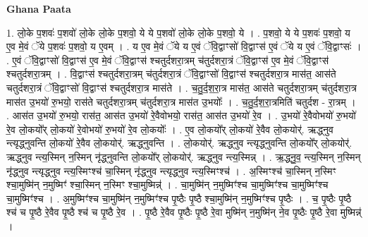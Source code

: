 \documentclass[17pt]{extarticle}
\begin{document}
\textbf{Ghana Paata } \newline

1. लो॒के प॒शवः॑ प॒शवो॑ लो॒के लो॒के प॒शवो॒ ये ये प॒शवो॑ लो॒के लो॒के प॒शवो॒ ये । . प॒शवो॒ ये ये प॒शवः॑ प॒शवो॒ य ए॒व मे॒वं ॅये प॒शवः॑ प॒शवो॒ य ए॒वम् । . य ए॒व मे॒वं ॅये य ए॒वं ॅवि॒द्वाꣳसो॑ वि॒द्वाꣳस॑ ए॒वं ॅये य ए॒वं ॅवि॒द्वाꣳसः॑ । . ए॒वं ॅवि॒द्वाꣳसो॑ वि॒द्वाꣳस॑ ए॒व मे॒वं ॅवि॒द्वाꣳस॑ श्चतुर्दशरा॒त्रम् च॑तुर्दशरा॒त्रं ॅवि॒द्वाꣳस॑ ए॒व मे॒वं ॅवि॒द्वाꣳस॑ श्चतुर्दशरा॒त्रम् । . वि॒द्वाꣳस॑ श्चतुर्दशरा॒त्रम् च॑तुर्दशरा॒त्रं ॅवि॒द्वाꣳसो॑ वि॒द्वाꣳस॑ श्चतुर्दशरा॒त्र मास॑त॒ आस॑ते चतुर्दशरा॒त्रं ॅवि॒द्वाꣳसो॑ वि॒द्वाꣳस॑ श्चतुर्दशरा॒त्र मास॑ते । . च॒तु॒र्द॒श॒रा॒त्र मास॑त॒ आस॑ते चतुर्दशरा॒त्रम् च॑तुर्दशरा॒त्र मास॑त उ॒भयो॑ रु॒भयो॒ रास॑ते चतुर्दशरा॒त्रम् च॑तुर्दशरा॒त्र मास॑त उ॒भयोः᳚ । . च॒तु॒र्द॒श॒रा॒त्रमिति॑ चतुर्दश - रा॒त्रम् । . आस॑त उ॒भयो॑ रु॒भयो॒ रास॑त॒ आस॑त उ॒भयो॑ रे॒वैवोभयो॒ रास॑त॒ आस॑त उ॒भयो॑ रे॒व । . उ॒भयो॑ रे॒वैवोभयो॑ रु॒भयो॑ रे॒व लो॒कयो᳚र् लो॒कयो॑ रे॒वोभयो॑ रु॒भयो॑ रे॒व लो॒कयोः᳚ । . ए॒व लो॒कयो᳚र् लो॒कयो॑ रे॒वैव लो॒कयोर्॑. ऋद्ध्नुव न्त्यृद्ध्नुवन्ति लो॒कयो॑ रे॒वैव लो॒कयोर्॑. ऋद्ध्नुवन्ति । . लो॒कयोर्॑. ऋद्ध्नुव न्त्यृद्ध्नुवन्ति लो॒कयो᳚र् लो॒कयोर्॑. ऋद्ध्नुव न्त्य॒स्मिन् न॒स्मिन् नृ॑द्ध्नुवन्ति लो॒कयो᳚र् लो॒कयोर्॑. ऋद्ध्नुव न्त्य॒स्मिन्न् । . ऋ॒द्ध्नु॒व॒ न्त्य॒स्मिन् न॒स्मिन् नृ॑द्ध्नुव न्त्यृद्ध्नुव न्त्य॒स्मिꣳश्च॑ चा॒स्मिन् नृ॑द्ध्नुव न्त्यृद्ध्नुव
न्त्य॒स्मिꣳश्च॑ । . अ॒स्मिꣳश्च॑ चा॒स्मिन् न॒स्मिꣳ श्चा॒मुष्मि॑न् न॒मुष्मिꣳ॑ श्चा॒स्मिन् न॒स्मिꣳ
श्चा॒मुष्मिन्न्॑ । . चा॒मुष्मि॑न् न॒मुष्मिꣳ॑श्च चा॒मुष्मिꣳ॑श्च चा॒मुष्मिꣳ॑श्च चा॒मुष्मिꣳ॑श्च । . अ॒मुष्मिꣳ॑श्च चा॒मुष्मि॑न् न॒मुष्मिꣳ॑श्च पृ॒ष्ठैः पृ॒ष्ठै श्चा॒मुष्मि॑न् न॒मुष्मिꣳ॑श्च पृ॒ष्ठैः । . च॒ पृ॒ष्ठैः पृ॒ष्ठै श्च॑ च पृ॒ष्ठै रे॒वैव पृ॒ष्ठै श्च॑ च पृ॒ष्ठै रे॒व । . पृ॒ष्ठै रे॒वैव पृ॒ष्ठैः पृ॒ष्ठै रे॒वा मुष्मि॑न् न॒मुष्मि॑न् ने॒व पृ॒ष्ठैः पृ॒ष्ठै रे॒वा मुष्मिन्न्॑ । \newline
\end{document}
